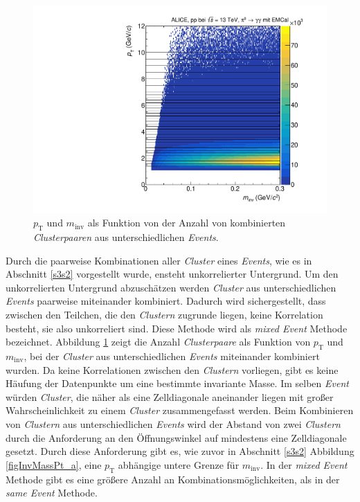 \begin{figure}[t!]
\centering
\includegraphics[width=.7\linewidth]{hInvMass_pT_Bkg.pdf}
\caption{$p_\text{T}$ und $m_\text{inv}$ als Funktion von der Anzahl von kombinierten  \textit{Clusterpaaren} aus unterschiedlichen \textit{Events}.}
\label{figInvMassPt_b}
\end{figure}
Durch die paarweise Kombinationen aller \textit{Cluster} eines \textit{Events}, wie es in Abschnitt \ref{s3s2} vorgestellt wurde, ensteht unkorrelierter Untergrund.
Um den unkorrelierten Untergrund abzuschätzen werden \textit{Cluster} aus unterschiedlichen \textit{Events} paarweise miteinander kombiniert.
Dadurch wird sichergestellt, dass zwischen den Teilchen, die den \textit{Clustern} zugrunde liegen, keine Korrelation besteht, sie also unkorreliert sind.
Diese Methode wird als \textit{mixed Event} Methode bezeichnet.
Abbildung \ref{figInvMassPt_b} zeigt die Anzahl \textit{Clusterpaare} als Funktion von $p_\text{T}$ und $m_\text{inv}$, bei der \textit{Cluster} aus unterschiedlichen \textit{Events} miteinander kombiniert wurden.
Da keine Korrelationen zwischen den \textit{Clustern} vorliegen, gibt es keine Häufung der Datenpunkte um eine bestimmte invariante Masse.
\newline
Im selben \textit{Event} würden \textit{Cluster}, die näher als eine Zelldiagonale aneinander liegen mit großer Wahrscheinlichkeit zu einem \textit{Cluster} zusammengefasst werden.
Beim Kombinieren von \textit{Clustern} aus unterschiedlichen \textit{Events} wird der Abstand von zwei \textit{Clustern} durch die Anforderung an den Öffnungswinkel auf mindestens eine Zelldiagonale gesetzt.
Durch diese Anforderung gibt es, wie zuvor in Abschnitt \ref{s3s2} Abbildung \ref{figInvMassPt_a}, eine $p_\text{T}$ abhängige untere Grenze für $m_\text{inv}$.
\newpage
\noindent
In der \textit{mixed Event} Methode gibt es eine größere Anzahl an Kombinationsmöglichkeiten, als in der \textit{same Event} Methode.
